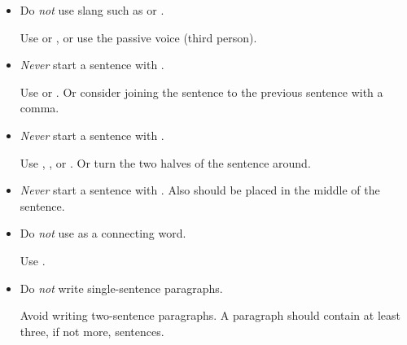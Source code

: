 \begin{itemize}
\item Do \emph{not} use slang such as  or .

Use  or , or use the passive voice (third
person).






\item \emph{Never} start a sentence with .

Use  or . Or consider joining the
sentence to the previous sentence with a comma.




\item \emph{Never} start a sentence with .

Use , , or . Or turn the two
halves of the sentence around.




\item \emph{Never} start a sentence with . Also should
be placed in the middle of the sentence.




\item Do \emph{not} use  as a connecting word.

Use .





\item Do \emph{not} write single-sentence paragraphs. 

Avoid writing two-sentence paragraphs. A paragraph should contain at
least three, if not more, sentences.


\end{itemize}











